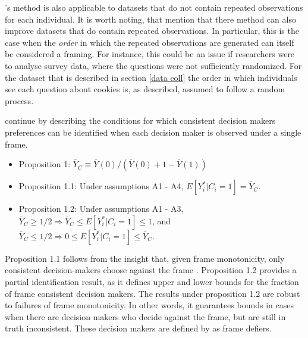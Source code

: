 \textcite{goldin2020}'s method is also applicable to datasets that do not contain repeated observations for each individual.
It is worth noting, that \textcite{goldin2020} mention that there method can also improve datasets that do contain repeated observations.
In particular, this is the case when the \textit{order} in which the repeated observations are generated can itself be considered a framing. 
For instance, this could be an issue if researchers were to analyse survey data, where the questions were not sufficiently randomized. 
For the dataset that is described in section \ref{data coll} the order in which individuals see each question about cookies is, as described, assumed to follow a random process.

\textcite{goldin2020} continue by describing the conditions for which consistent decision makers preferences can be identified when each decision maker
is observed under a single frame. 

\begin{itemize}
    \item Proposition 1: $ \bar{Y}_C \equiv \bar{Y}(0)/(\bar{Y}(0) + 1 - \bar{Y}(1))$
    \item Proposition 1.1: Under assumptions A1 - A4, $ E[Y^*_i | C_i = 1] = \bar{Y}_C $.
    \item Proposition 1.2: Under assumptions A1 - A3, $ \bar{Y}_C \geq 1/2 \Rightarrow \bar{Y}_C \leq E[Y^*_i | C_i = 1] \leq 1$, and $\bar{Y}_C \leq 1/2 \Rightarrow 0 \leq E[Y^*_i| C_i = 1] \leq \bar{Y}_C$.
\end{itemize}

Proposition 1.1 follows from the insight that, given frame monotonicity, only consistent decision-makers choose against the frame \parencite[p. 2768]{goldin2020}.
Proposition 1.2 provides a partial identification result, as it defines upper and lower bounds for the fraction of frame consistent decision makers. The results under 
proposition 1.2 are robust to failures of frame monotonicity. In other words, it guarantees bounds in cases when there are decision makers
who decide against the frame, but are still in truth inconsistent. These decision makers are defined by \textcite[p. 2768]{goldin2020}
as frame defiers.

